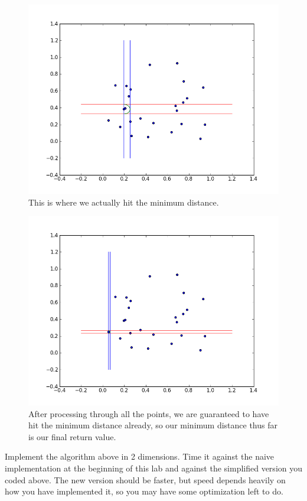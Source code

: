 \begin{figure}[H]
\includegraphics[width = \textwidth]{ptsweep20.png}
\caption{This is where we actually hit the minimum distance.}
\end{figure}

\begin{figure}[H]
\includegraphics[width = \textwidth]{ptsweep23.png}
\caption{After processing through all the points, we are guaranteed to have hit the minimum distance already, so our minimum distance thus far is our final return value.}
\end{figure}

\begin{problem}
Implement the algorithm above in 2 dimensions. 
Time it against the naive implementation at the beginning of this lab and against the simplified version you coded above.
The new version should be faster, but speed depends heavily on how you have implemented it, so you may have some optimization left to do.
\end{problem}

